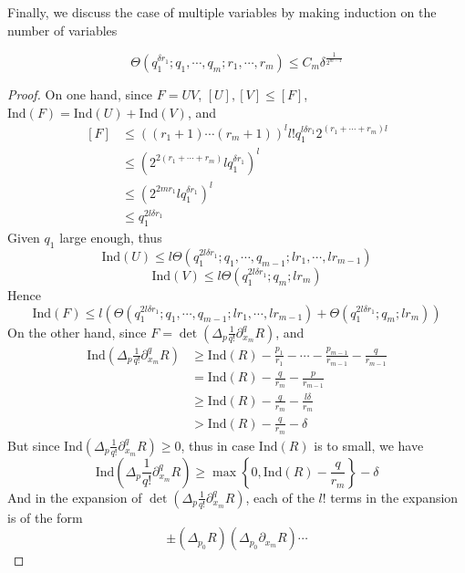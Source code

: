Finally, we discuss the case of multiple variables by making induction on the number of variables

\begin{lemma}\label{lemma 41}
$$ \Theta(q_{1}^{\delta r_{1}};q_{1},\cdots,q_{m};r_{1},\cdots,r_{m}) \leq C_{m}\delta^{\frac{1}{2^{m-1}}} $$
\end{lemma}

\begin{proof}
On one hand, since $ F=UV $, $ [U],[V] \leq [F] $, $ \mathrm{Ind}(F) = \mathrm{Ind}(U)+\mathrm{Ind}(V) $, and
$$ 
\begin{aligned}
[F] 
&\leq \left( (r_{1}+1)\cdots(r_{m}+1) \right)^{l}l!q_{1}^{l\delta r_{1}}2^{(r_{1}+\cdots+r_{m})l} \\
&\leq \left( 2^{2(r_{1}+\cdots+r_{m})}lq_{1}^{\delta r_{1}} \right)^{l} \\
&\leq \left( 2^{2mr_{1}}lq_{1}^{\delta r_{1}} \right)^{l} \\
&\leq q_{1}^{2l\delta r_{1}}
\end{aligned}
$$
Given $ q_{1} $ large enough, thus
$$ \mathrm{Ind}(U) \leq l\Theta(q_{1}^{2l\delta r_{1}};q_{1},\cdots,q_{m-1};lr_{1},\cdots,lr_{m-1}) $$
$$ \mathrm{Ind}(V) \leq l\Theta(q_{1}^{2l\delta r_{1}};q_{m};lr_{m}) $$
Hence
$$ \mathrm{Ind}(F) \leq l\left( \Theta(q_{1}^{2l\delta r_{1}};q_{1},\cdots,q_{m-1};lr_{1},\cdots,lr_{m-1}) + 
\Theta(q_{1}^{2l\delta r_{1}};q_{m};lr_{m}) \right) $$
On the other hand, since $ F = \det\left( \Delta_{p}\frac{1}{q!}\partial_{x_{m}}^{q} R \right) $, and 
$$
\begin{aligned}
\mathrm{Ind}\left( \Delta_{p}\frac{1}{q!}\partial_{x_{m}}^{q}R \right) 
&\geq \mathrm{Ind}(R) - \frac{p_{1}}{r_{1}} - \cdots - \frac{p_{m-1}}{r_{m-1}} - \frac{q}{r_{m-1}} \\
&= \mathrm{Ind}(R) - \frac{q}{r_{m}} - \frac{p}{r_{m-1}} \\
&\geq \mathrm{Ind}(R) - \frac{q}{r_{m}} - \frac{l\delta}{r_{m}} \\
&> \mathrm{Ind}(R) - \frac{q}{r_{m}} - \delta
\end{aligned}
$$
But since $ \mathrm{Ind}\left( \Delta_{p}\frac{1}{q!}\partial_{x_{m}}^{q}R \right) \geq 0 $, thus in case $ \mathrm{Ind}(R) $ is to small, we have
$$ \mathrm{Ind}\left( \Delta_{p}\frac{1}{q!}\partial_{x_{m}}^{q}R \right) \geq 
\max\left\{0, \mathrm{Ind}(R) - \frac{q}{r_{m}}\right\} - \delta $$
And in the expansion of $ \det\left( \Delta_{p}\frac{1}{q!}\partial_{x_{m}}^{q} R \right) $, each of the $ l! $ terms in the expansion is of the form 
$$ \pm \left(\Delta_{p_{0}}R\right)\left(\Delta_{p_{0}}\partial_{x_{m}}R\right)\cdots
$$
\end{proof}
